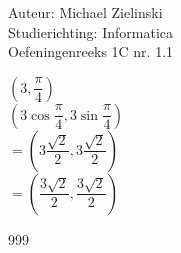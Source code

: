 \documentclass[a4paper]{article}
\begin{document}
  
\noindent \large Auteur: Michael Zielinski \\
\noindent \large Studierichting: Informatica\\
\noindent \large Oefeningenreeks 1C nr. 1.1\\

\medskip

\normalsize

$\left(3, \dfrac{\pi}{4}\right)$\\

$\left(3 \cos{\dfrac{\pi}{4}}, 3 \sin{\dfrac{\pi}{4}}\right)$\\

$=\left(3 \dfrac{\sqrt{2}}{2}, 3 \dfrac{\sqrt{2}}{2}\right)$\\

$=\left(\dfrac{3\sqrt{2}}{2}, \dfrac{3\sqrt{2}}{2}\right)$

\begin{thebibliography}{999}
\end{thebibliography}
\end{document}
